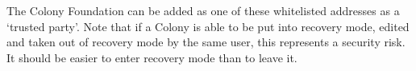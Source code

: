 The Colony Foundation can be added as one of these whitelisted addresses as a `trusted party'. Note that if a Colony is able to be put into recovery mode, edited and taken out of recovery mode by the same user, this represents a security risk. It should be easier to enter recovery mode than to leave it.
